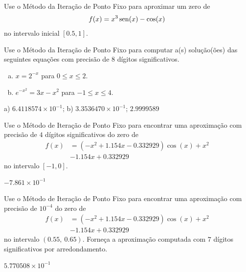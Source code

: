 \begin{exer}
  Use o Método da Iteração de Ponto Fixo para aproximar um zero de
  \begin{equation}
    f(x)=x^3\operatorname{sen}(x)-\cos(x)
  \end{equation}
  no intervalo inicial $[0.5, 1]$.
\end{exer}

\begin{exer}
  Use o Método da Iteração de Ponto Fixo para computar a(s) solução(ões) das seguintes equações com precisão de 8 dígitos significativos.
  \begin{enumerate}[a)]
  \item $x = 2^{-x}$ para $0\leq x \leq 2$.
  \item $e^{-x^2} = 3x - x^2$ para $-1\leq x\leq 4$.
  \end{enumerate}
\end{exer}
\begin{resp}
  a) $6.4118574\times 10^{-1}$; b) $3.3536470\times 10^{-1}$; $2.9999589$
\end{resp}

\begin{exer}
  Use o Método de Iteração de Ponto Fixo para encontrar uma aproximação com precisão de $4$ dígitos significativos do zero de 
  \begin{equation}
    \begin{aligned}
      f(x) &= (-x^2+1.154x-0.332929)\cos(x) + x^2 \\
      &- 1.154x + 0.332929
  \end{aligned}
  \end{equation}
  no intervalo $[-1, 0]$.
\end{exer}
\begin{resp}
  $-7.861\times 10^{-1}$
\end{resp}

\begin{exer}
  Use o Método de Iteração de Ponto Fixo para encontrar uma aproximação com precisão de $10^{-4}$ do zero de
  \begin{equation}
    \begin{aligned}
      f(x) &= (-x^2+1.154x-0.332929)\cos(x) + x^2\\
      &- 1.154x + 0.332929
  \end{aligned}
  \end{equation}
no intervalo $(0.55, ~0.65)$. Forneça a aproximação computada com $7$ dígitos significativos por arredondamento.
\end{exer}
\begin{resp}
  $5.770508\times 10^{-1}$
\end{resp}

